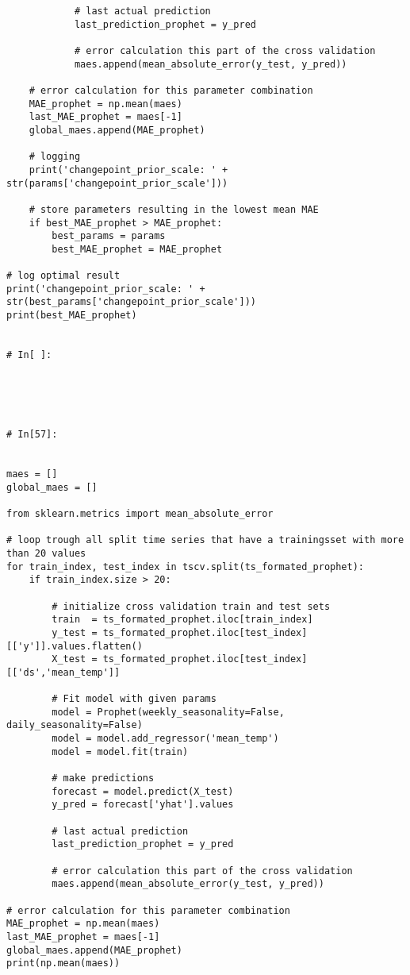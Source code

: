 \begin{verbatim}
            # last actual prediction 
            last_prediction_prophet = y_pred

            # error calculation this part of the cross validation
            maes.append(mean_absolute_error(y_test, y_pred))
    
    # error calculation for this parameter combination
    MAE_prophet = np.mean(maes)
    last_MAE_prophet = maes[-1]
    global_maes.append(MAE_prophet)
    
    # logging
    print('changepoint_prior_scale: ' + str(params['changepoint_prior_scale']))
    
    # store parameters resulting in the lowest mean MAE
    if best_MAE_prophet > MAE_prophet:
        best_params = params
        best_MAE_prophet = MAE_prophet

# log optimal result          
print('changepoint_prior_scale: ' + str(best_params['changepoint_prior_scale']))
print(best_MAE_prophet)


# In[ ]:





# In[57]:


maes = []
global_maes = []

from sklearn.metrics import mean_absolute_error

# loop trough all split time series that have a trainingsset with more than 20 values
for train_index, test_index in tscv.split(ts_formated_prophet):    
    if train_index.size > 20:  

        # initialize cross validation train and test sets
        train  = ts_formated_prophet.iloc[train_index]
        y_test = ts_formated_prophet.iloc[test_index][['y']].values.flatten()
        X_test = ts_formated_prophet.iloc[test_index][['ds','mean_temp']]

        # Fit model with given params
        model = Prophet(weekly_seasonality=False, daily_seasonality=False)
        model = model.add_regressor('mean_temp')
        model = model.fit(train)

        # make predictions
        forecast = model.predict(X_test)
        y_pred = forecast['yhat'].values

        # last actual prediction 
        last_prediction_prophet = y_pred

        # error calculation this part of the cross validation
        maes.append(mean_absolute_error(y_test, y_pred))

# error calculation for this parameter combination
MAE_prophet = np.mean(maes)
last_MAE_prophet = maes[-1]
global_maes.append(MAE_prophet)
print(np.mean(maes))



\end{verbatim}
